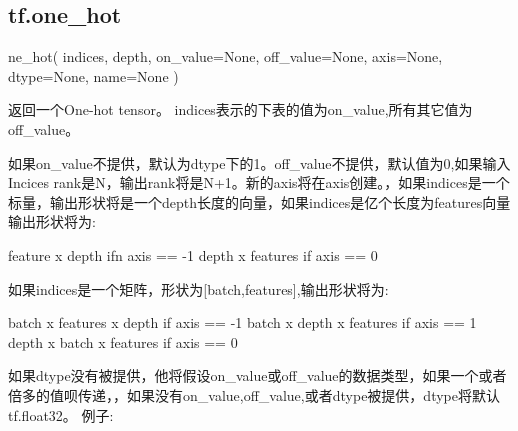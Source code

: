 \subsection{tf.one\_hot}
\begin{python}
ne_hot(
    indices,
    depth,
    on_value=None,
    off_value=None,
    axis=None,
    dtype=None,
    name=None
)
\end{python}
返回一个One-hot tensor。
indices表示的下表的值为on\_value,所有其它值为off\_value。

如果on\_value不提供，默认为dtype下的1。off\_value不提供，默认值为0,如果输入Incices rank是N，输出rank将是N+1。新的axis将在axis创建。，如果indices是一个标量，输出形状将是一个depth长度的向量，如果indices是亿个长度为features向量输出形状将为:
\begin{python}
feature x depth ifn axis == -1
depth x features if axis == 0
\end{python}
如果indices是一个矩阵，形状为[batch,features],输出形状将为:
\begin{python}
 batch x features x depth if axis == -1
  batch x depth x features if axis == 1
  depth x batch x features if axis == 0
\end{python}
如果dtype没有被提供，他将假设on\_value或off\_value的数据类型，如果一个或者倍多的值呗传递，，如果没有on\_value,off\_value,或者dtype被提供，dtype将默认tf.float32。
例子:

